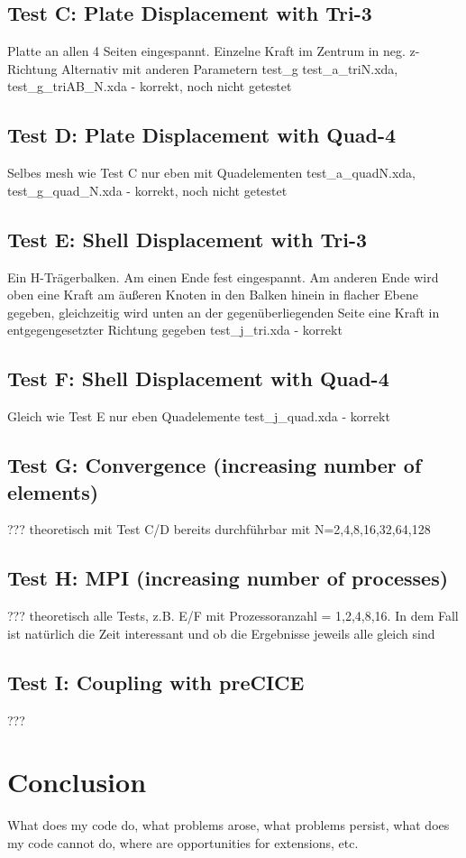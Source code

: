 \documentclass[11pt,twoside]{scrartcl}
\begin{document}
 \subsection{Test C: Plate Displacement with Tri-3}
 Platte an allen 4 Seiten eingespannt. Einzelne Kraft im Zentrum in neg. z-Richtung\newline
 Alternativ mit anderen Parametern test\_g\newline
 test\_a\_triN.xda, test\_g\_triAB\_N.xda - korrekt, noch nicht getestet
 \subsection{Test D: Plate Displacement with Quad-4}
 Selbes mesh wie Test C nur eben mit Quadelementen\newline
 test\_a\_quadN.xda, test\_g\_quad\_N.xda - korrekt, noch nicht getestet
 \subsection{Test E: Shell Displacement with Tri-3}
 Ein H-Trägerbalken. Am einen Ende fest eingespannt. Am anderen Ende wird oben eine Kraft am äußeren Knoten in den Balken hinein in flacher Ebene gegeben, gleichzeitig wird unten an der gegenüberliegenden Seite eine Kraft in entgegengesetzter Richtung gegeben\newline
 test\_j\_tri.xda - korrekt
 \subsection{Test F: Shell Displacement with Quad-4}
 Gleich wie Test E nur eben Quadelemente\newline
 test\_j\_quad.xda - korrekt
 \subsection{Test G: Convergence (increasing number of elements)}
 ??? theoretisch mit Test C/D bereits durchführbar mit N=2,4,8,16,32,64,128
 \subsection{Test H: MPI (increasing number of processes)}
 ??? theoretisch alle Tests, z.B. E/F mit Prozessoranzahl = 1,2,4,8,16. In dem Fall ist natürlich die Zeit interessant und ob die Ergebnisse jeweils alle gleich sind
 \subsection{Test I: Coupling with preCICE}
 ???
\newpage
\section{Conclusion}
What does my code do, what problems arose, what problems persist, what does my code cannot do, where are opportunities for extensions, etc.
\newpage


\Affirmation
\end{document}
